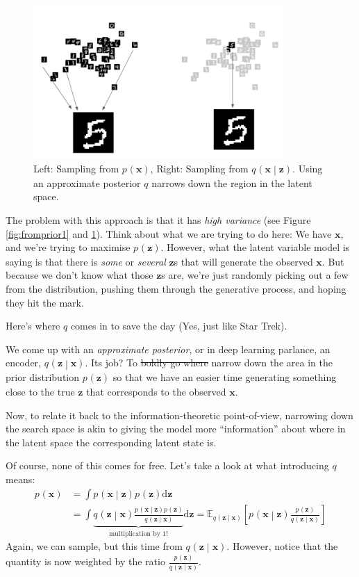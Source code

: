 \documentclass{article}
\newcommand{\prob}[3]{{#1}_{#2} \left( #3 \right)}
\newcommand{\condprob}[4]{{#1}_{#2} \left( #3 \middle| #4 \right)}
\newcommand{\expected}[2]{\mathbb{E}_{#1}\left[ #2 \right]}
\newcommand{\x}{\mathbf{x}}
\newcommand{\z}{\mathbf{z}}
\begin{document}
\begin{figure}
\begin{center}
\includegraphics[width=0.85\textwidth]{figures/q_vs_noq.png}
\caption{Left: Sampling from $\prob{p}{}{\x}$, Right: Sampling from $\condprob{q}{}{\x}{\z}$. Using an approximate posterior $q$ narrows down the region in the latent space.}
\label{fig:fromprior2}
\end{center}
\end{figure}
The problem with this approach is that it has \emph{high variance} (see Figure \ref{fig:fromprior1} and \ref{fig:fromprior2}). Think about what we are trying to do here: We have $\x$, and we're trying to maximise $\prob{p}{}{\z}$. However, what the latent variable model is saying is that there is \emph{some} or \emph{several} $\z$s that will generate the observed $\x$. But because we don't know what those $\z$s are, we're just randomly picking out a few from the distribution, pushing them through the generative process, and hoping they hit the mark.

Here's where $q$ comes in to save the day (Yes, just like Star Trek).

We come up with an \emph{approximate posterior}, or in deep learning parlance, an encoder, $\condprob{q}{}{\z}{\x}$. Its job? To \sout{boldly go where} narrow down the area in the prior distribution $\prob{p}{}{\z}$ so that we have an easier time generating something close to the true $\z$ that corresponds to the observed $\x$. 

Now, to relate it back to the information-theoretic point-of-view, narrowing down the search space is akin to giving the model more ``information'' about where in the latent space the corresponding latent state is.

Of course, none of this comes for free. Let's take a look at what introducing $q$ means:
\begin{align*}
\prob{p}{}{\x} 
&= \int \condprob{p}{}{\x}{\z} \prob{p}{}{\z} \mathrm{d}\z \\
&= \int \underbrace{\condprob{q}{}{\z}{\x} \frac{\condprob{p}{}{\x}{\z} \prob{p}{}{\z}}{\condprob{q}{}{\z}{\x}}}_{\text{multiplication by 1!}} \mathrm{d}\z = \expected{\condprob{q}{}{\z}{\x}}{\condprob{p}{}{\x}{\z} 
\frac{\prob{p}{}{\z}}{\condprob{q}{}{\z}{\x}}} 
\end{align*}
Again, we can sample, but this time from $\condprob{q}{}{\z}{\x}$. 
However, notice that the quantity is now weighted by the ratio $\frac{\prob{p}{}{\z}}{\condprob{q}{}{\z}{\x}}$. 
\end{document}
